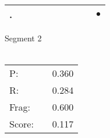 \documentclass[landscape]{article}
\newcommand{\ssp}{\hspace{2pt}}
\newcommand{\mex}{\cellcolor{g}$\bullet$}
\begin{document}
\begin{tabular}{|l|p{10pt}|p{10pt}|p{10pt}|p{10pt}|p{10pt}|p{10pt}|p{10pt}|p{10pt}|p{10pt}|}
\hline
\ssp \cellcolor{ref8}. \ssp&\hspace{2pt}&\hspace{2pt}&\hspace{2pt}&\hspace{2pt}&\hspace{2pt}&\hspace{2pt}&\hspace{2pt}&\hspace{2pt}&\hspace{2pt}\mex\\
\hline
\end{tabular}

\vspace{6pt}
\noindent Segment 2\\\\
\noindent\begin{tabular}{lm{12pt}r}
\hline
P:&&0.360\\
R:&&0.284\\
Frag:&&0.600\\
Score:&&0.117\\
\end{tabular}

\newpage
\end{document}
